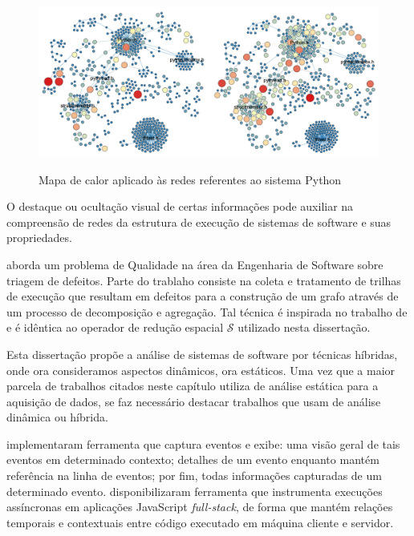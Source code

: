 \begin{figure}[!htb]
    \centering
    \caption{Mapa de calor aplicado às redes referentes ao sistema Python}
    \includegraphics[width=1\textwidth]{../shared files/figures/2.02....related...work/PythonNetworks.png}
    \label{Figure:PythonNetworks}
\end{figure}

O destaque ou ocultação visual de certas informações pode auxiliar na
compreensão de redes da estrutura de execução de sistemas de software e suas
propriedades.

 aborda um problema de Qualidade na área da Engenharia
de Software sobre triagem de defeitos. Parte do trablaho consiste na coleta e
tratamento de trilhas de execução que resultam em defeitos para a construção de 
um grafo através de um processo de decomposição e agregação. Tal técnica é
inspirada no trabalho de  e é idêntica ao
operador de redução espacial $\mathcal{S}$ utilizado nesta dissertação.

Esta dissertação propõe a análise de sistemas de software por técnicas híbridas,
onde ora consideramos aspectos dinâmicos, ora estáticos.
Uma vez que a maior parcela de trabalhos citados neste capítulo utiliza de
análise estática para a aquisição de dados, se faz necessário destacar trabalhos
que usam de análise dinâmica ou híbrida.

 implementaram ferramenta que captura
eventos e exibe: uma visão geral de tais eventos em determinado contexto;
detalhes de um evento enquanto mantém referência na linha de eventos; por fim,
todas informações capturadas de um determinado evento.
 disponibilizaram ferramenta que
instrumenta execuções assíncronas em aplicações JavaScript \textit{full-stack},
de forma que mantém relações temporais e contextuais entre código executado em
máquina cliente e servidor.

